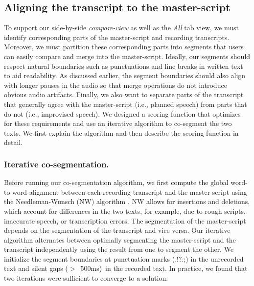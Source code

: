 \subsection{Aligning the transcript to the master-script}
To support our side-by-side \textit{compare-view} as well as the \textit{All} tab view, we must identify corresponding parts of the master-script and recording transcripts. Moreover, we must partition these corresponding parts into segments that users can easily compare and merge into the master-script. Ideally, our segments should respect natural boundaries such as punctuations and line breaks in written text to aid readability. As discussed earlier, the segment boundaries should also align with longer pauses in the audio so that merge operations do not introduce obvious audio artifacts. Finally, we also want to separate parts of the transcript that generally agree with the master-script (i.e., planned speech) from parts that do not (i.e., improvised speech).  We designed a scoring function that optimizes for these requirements and use an iterative algorithm to co-segment the two texts. We first explain the algorithm and then describe the scoring function in detail.

\subsubsection{Iterative co-segmentation.}
Before running our co-segmentation algorithm, we first compute the global word-to-word alignment between each recording transcript and the master-script using the Needleman-Wunsch (NW) algorithm \cite{needleman1970general}. NW allows for insertions and deletions, which account for differences in the two texts, for example, due to rough scripts, inaccurate speech, or transcription errors.
%
The segmentation of the master-script depends on the segmentation of the transcript and vice versa. Our iterative algorithm alternates between optimally segmenting the master-script and the transcript independently using the result from one to segment the other. We initialize the segment boundaries at punctuation marks (.!?:;) in the unrecorded text and silent gaps ($>$\ 500ms)\ in the recorded text. In practice, we
found that two iterations were sufficient to converge to a solution.

